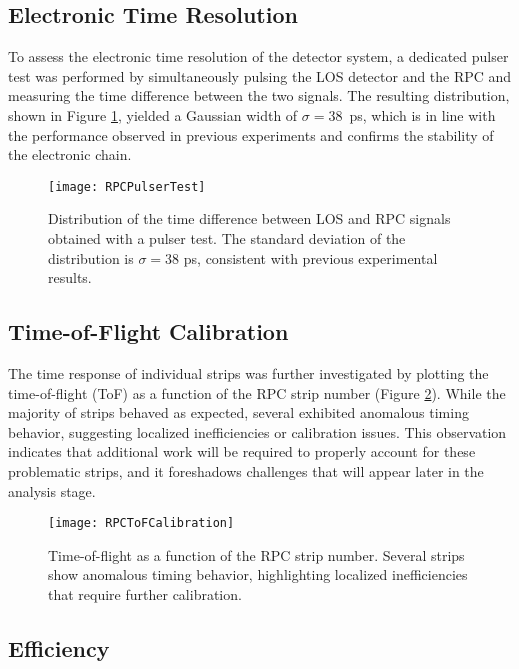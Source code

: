 \subsection{Electronic Time Resolution}

To assess the electronic time resolution of the detector system, a dedicated pulser test was performed by simultaneously pulsing the LOS detector and the \gls{RPC} and measuring the time difference between the two signals. The resulting distribution, shown in Figure \ref{fig:RPCPulserTest}, yielded a Gaussian width of $\sigma = 38$~ps, which is in line with the performance observed in previous experiments and confirms the stability of the electronic chain.

\begin{figure}
	\centering
	\texttt{[image: RPCPulserTest]}
	\caption[Time difference distribution between LOS and RPC signals]{Distribution of the time difference between LOS and \gls{RPC} signals obtained with a pulser test. The standard deviation of the distribution is $\sigma = 38$ ps, consistent with previous experimental results.}
	\label{fig:RPCPulserTest}
\end{figure}

\subsection{Time-of-Flight Calibration}

The time response of individual strips was further investigated by plotting the time-of-flight (ToF) as a function of the \gls{RPC} strip number (Figure \ref{fig:RPCToFCalibration}). While the majority of strips behaved as expected, several exhibited anomalous timing behavior, suggesting localized inefficiencies or calibration issues. This observation indicates that additional work will be required to properly account for these problematic strips, and it foreshadows challenges that will appear later in the analysis stage.

\begin{figure}
	\centering
	\texttt{[image: RPCToFCalibration]}
	\caption[Time-of-flight vs. RPC strip number]{Time-of-flight as a function of the \gls{RPC} strip number. Several strips show anomalous timing behavior, highlighting localized inefficiencies that require further calibration.}
	\label{fig:RPCToFCalibration}
\end{figure}

\subsection{Efficiency}

